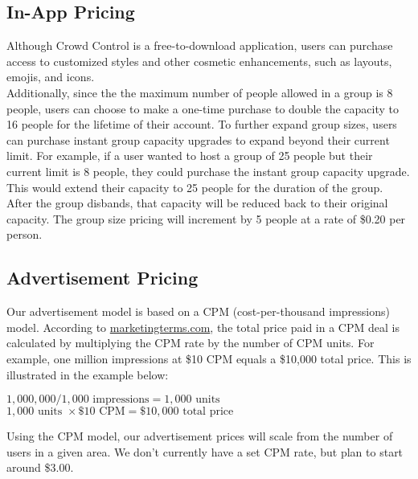 \subsection{In-App Pricing}
Although Crowd Control is a free-to-download application, users can purchase access to customized styles and other cosmetic enhancements, such as layouts, emojis, and icons. \\

Additionally, since the the maximum number of people allowed in a group is 8 people, users can choose to make a one-time purchase to double the capacity to 16 people for the lifetime of their account. To further expand group sizes, users can purchase instant group capacity upgrades to expand beyond their current limit. For example, if a user wanted to host a group of 25 people but their current limit is 8 people, they could purchase the instant group capacity upgrade. This would extend their capacity to 25 people for the duration of the group. After the group disbands, that capacity will be reduced back to their original capacity. The group size pricing will increment by 5 people at a rate of \$0.20 per person.

\subsection{Advertisement Pricing}
Our advertisement model is based on a CPM (cost-per-thousand impressions) model. According to \url{marketingterms.com}, the total price paid in a CPM deal is calculated by multiplying the CPM rate by the number of CPM units. For example, one million impressions at \$10 CPM equals a \$10,000 total price. This is illustrated in the example below:

\begin{center}
$1,000,000 / 1,000 \textrm{ impressions} = 1,000 \textrm{ units}$\\
$1,000 \textrm{ units } \times \$10 \textrm{ CPM} = \$10,000 \textrm{ total price}$
\end{center}

Using the CPM model, our advertisement prices will scale from the number of users in a given area. We don't currently have a set CPM rate, but plan to start around \$3.00.

